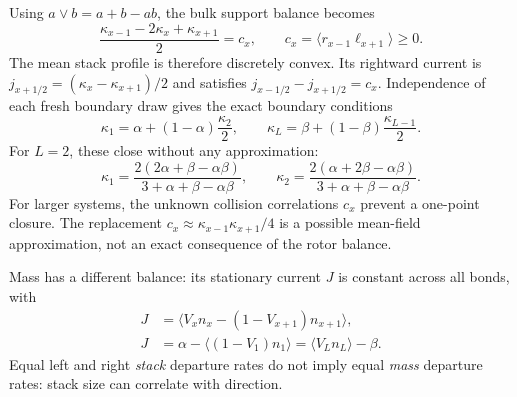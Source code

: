 \documentclass{article}
\begin{document}
Using $a\lor b=a+b-ab$, the bulk support balance becomes
\begin{equation}
\boxed{
\frac{\kappa_{x-1}-2\kappa_x+\kappa_{x+1}}{2}
 =c_x,\qquad
c_x=\langle r_{x-1}\ell_{x+1}\rangle\geq0.
}
\label{eq:stationary-coalescence}
\end{equation}
The mean stack profile is therefore discretely convex.  Its rightward
current is $j_{x+1/2}=(\kappa_x-\kappa_{x+1})/2$ and satisfies
$j_{x-1/2}-j_{x+1/2}=c_x$.  Independence of each fresh boundary draw gives
the exact boundary conditions
\begin{equation}
\kappa_1=\alpha+(1-\alpha)\frac{\kappa_2}{2},\qquad
\kappa_L=\beta+(1-\beta)\frac{\kappa_{L-1}}{2}.
\label{eq:stationary-support-boundaries}
\end{equation}
For $L=2$, these close without any approximation:
\begin{equation}
\kappa_1=\frac{2(2\alpha+\beta-\alpha\beta)}
 {3+\alpha+\beta-\alpha\beta},\qquad
\kappa_2=\frac{2(\alpha+2\beta-\alpha\beta)}
 {3+\alpha+\beta-\alpha\beta}.
\end{equation}
For larger systems, the unknown collision correlations $c_x$ prevent a
one-point closure.  The replacement $c_x\approx\kappa_{x-1}\kappa_{x+1}/4$
is a possible mean-field approximation, not an exact consequence of the
rotor balance.

Mass has a different balance: its stationary current $J$ is constant
across all bonds, with
\begin{align}
J&=\langle V_xn_x-(1-V_{x+1})n_{x+1}\rangle,\\
J&=\alpha-\langle(1-V_1)n_1\rangle
 =\langle V_Ln_L\rangle-\beta.
\label{eq:stationary-mass-current}
\end{align}
Equal left and right \emph{stack} departure rates do not imply equal
\emph{mass} departure rates: stack size can correlate with direction.
\end{document}
